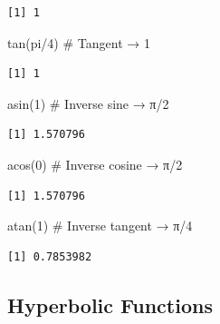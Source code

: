 \documentclass[
  letterpaper,
  DIV=11,
  numbers=noendperiod]{scrreprt}
\newenvironment{Shaded}{\begin{snugshade}}{\end{snugshade}}
\newcommand{\CommentTok}[1]{\textcolor[rgb]{0.37,0.37,0.37}{#1}}
\newcommand{\DecValTok}[1]{\textcolor[rgb]{0.68,0.00,0.00}{#1}}
\newcommand{\FunctionTok}[1]{\textcolor[rgb]{0.28,0.35,0.67}{#1}}
\newcommand{\NormalTok}[1]{\textcolor[rgb]{0.00,0.23,0.31}{#1}}
\newcommand{\SpecialCharTok}[1]{\textcolor[rgb]{0.37,0.37,0.37}{#1}}
\begin{document}
\begin{verbatim}
[1] 1
\end{verbatim}

\begin{Shaded}
\begin{Highlighting}[]
\FunctionTok{tan}\NormalTok{(pi}\SpecialCharTok{/}\DecValTok{4}\NormalTok{)              }\CommentTok{\# Tangent → 1}
\end{Highlighting}
\end{Shaded}

\begin{verbatim}
[1] 1
\end{verbatim}

\begin{Shaded}
\begin{Highlighting}[]
\FunctionTok{asin}\NormalTok{(}\DecValTok{1}\NormalTok{)                }\CommentTok{\# Inverse sine → π/2}
\end{Highlighting}
\end{Shaded}

\begin{verbatim}
[1] 1.570796
\end{verbatim}

\begin{Shaded}
\begin{Highlighting}[]
\FunctionTok{acos}\NormalTok{(}\DecValTok{0}\NormalTok{)                }\CommentTok{\# Inverse cosine → π/2}
\end{Highlighting}
\end{Shaded}

\begin{verbatim}
[1] 1.570796
\end{verbatim}

\begin{Shaded}
\begin{Highlighting}[]
\FunctionTok{atan}\NormalTok{(}\DecValTok{1}\NormalTok{)                }\CommentTok{\# Inverse tangent → π/4}
\end{Highlighting}
\end{Shaded}

\begin{verbatim}
[1] 0.7853982
\end{verbatim}

\subsection{Hyperbolic Functions}\label{hyperbolic-functions}
\end{document}
